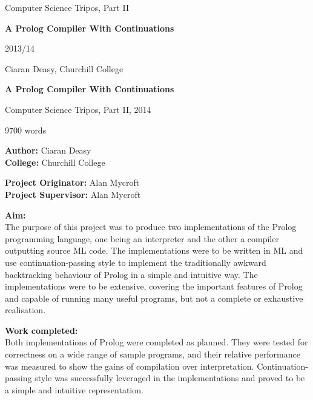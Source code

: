 \documentclass[12pt]{article}
\begin{document}
\thispagestyle{empty}

\medskip
{}
\medskip
{}

\vfil

\centerline{\large Computer Science Tripos, Part II}
\vspace{0.4in}
\centerline{\Large\bf A Prolog Compiler With Continuations}
\vspace{0.3in}
\centerline{\large 2013/14}
\vspace{2.5in}

\newpage
\hspace{5px}
\newpage

\vfil

\centerline{\large Ciaran Deasy, Churchill College}
\vspace{0.4in}
\centerline{\Large\bf A Prolog Compiler With Continuations}
\vspace{0.3in}
\centerline{\large Computer Science Tripos, Part II, 2014}
\vspace{0.1in}
\centerline{ 9700 words}
\vspace{0.25in}


{\bf Author:} Ciaran Deasy\\
{\bf College:} Churchill College

\vspace{0.25in}

{\bf Project Originator:} Alan Mycroft\\
{\bf Project Supervisor:} Alan Mycroft

\vspace{0.25in}

{\bf Aim:}\\
The purpose of this project was to produce two implementations of the Prolog programming language, one being an interpreter and the other a compiler outputting source ML code. 
The implementations were to be written in ML and use continuation-passing style to implement the traditionally awkward backtracking behaviour of Prolog in a simple and intuitive way. 
The implementations were to be extensive, covering the important features of Prolog and capable of running many useful programs, but not a complete or exhaustive realisation.

\vspace{0.20in}

{\bf Work completed:}\\
Both implementations of Prolog were completed as planned. 
They were tested for correctness on a wide range of sample programs, and their relative performance was measured to show the gains of compilation over interpretation. 
Continuation-passing style was successfully leveraged in the implementations and proved to be a simple and intuitive representation.
\end{document}
